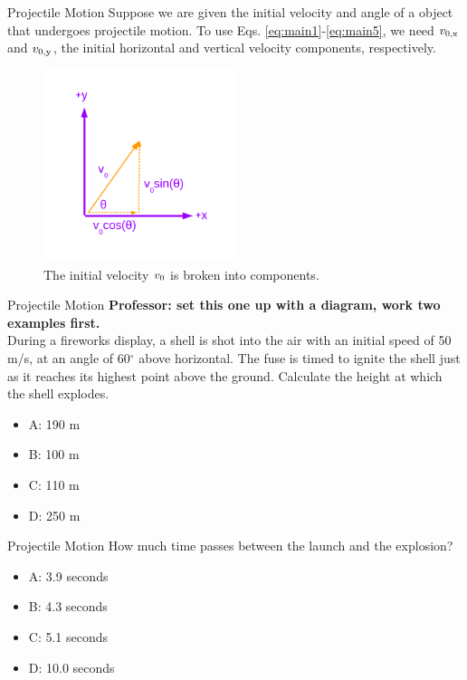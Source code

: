 \documentclass{beamer}
\begin{document}
\begin{frame}{Projectile Motion}
\small
Suppose we are given the initial velocity and angle of a object that undergoes projectile motion.  To use Eqs. \ref{eq:main1}-\ref{eq:main5}, we need $v_{\rm 0,x}$ and $v_{\rm 0,y}$, the initial horizontal and vertical velocity components, respectively.\\
\begin{figure}
\centering
\includegraphics[width=0.5\textwidth,trim=1cm 1cm 1cm 1cm,clip=true]{figures/Vectors1.pdf}
\caption{\label{fig:components} The initial velocity $v_{\rm 0}$ is broken into components.}
\end{figure}
\end{frame}

\begin{frame}{Projectile Motion}
\small
\textbf{Professor: set this one up with a diagram, work two examples first.} \\
During a fireworks display, a shell is shot into the air with an initial speed of 50 m/s, at an angle of 60$^{\circ}$ above horizontal.  The fuse is timed to ignite the shell just as it reaches its highest point above the ground.  Calculate the height at which the shell explodes.
\begin{itemize}
\item A: 190 m
\item B: 100 m
\item C: 110 m
\item D: 250 m
\end{itemize}
\end{frame}

\begin{frame}{Projectile Motion}
\small
How much time passes between the launch and the explosion?
\begin{itemize}
\item A: 3.9 seconds
\item B: 4.3 seconds
\item C: 5.1 seconds
\item D: 10.0 seconds
\end{itemize}
\end{frame}
\end{document}
